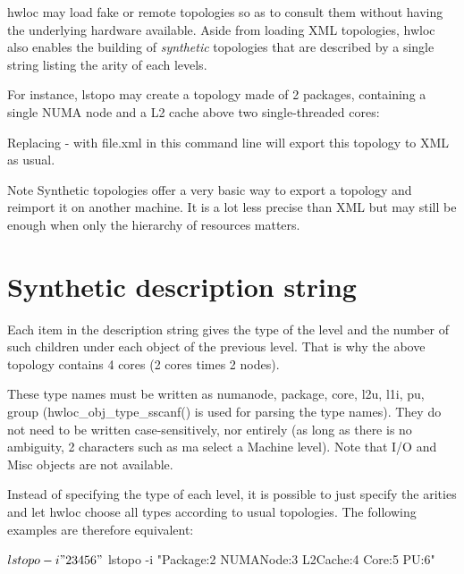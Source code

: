 

hwloc may load fake or remote topologies so as to consult them without having the underlying hardware available. Aside from loading X\+ML topologies, hwloc also enables the building of {\itshape synthetic} topologies that are described by a single string listing the arity of each levels.

For instance, lstopo may create a topology made of 2 packages, containing a single N\+U\+MA node and a L2 cache above two single-\/threaded cores\+:



Replacing {\ttfamily -\/} with {\ttfamily file.\+xml} in this command line will export this topology to X\+ML as usual.

\begin{DoxyNote}{Note}
Synthetic topologies offer a very basic way to export a topology and reimport it on another machine. It is a lot less precise than X\+ML but may still be enough when only the hierarchy of resources matters.
\end{DoxyNote}
 \hypertarget{a00389_synthetic_string}{}\section{Synthetic description string}\label{a00389_synthetic_string}
Each item in the description string gives the type of the level and the number of such children under each object of the previous level. That is why the above topology contains 4 cores (2 cores times 2 nodes).

These type names must be written as {\ttfamily numanode}, {\ttfamily package}, {\ttfamily core}, {\ttfamily l2u}, {\ttfamily l1i}, {\ttfamily pu}, {\ttfamily group} (hwloc\+\_\+obj\+\_\+type\+\_\+sscanf() is used for parsing the type names). They do not need to be written case-\/sensitively, nor entirely (as long as there is no ambiguity, 2 characters such as {\ttfamily ma} select a Machine level). Note that I/O and Misc objects are not available.

Instead of specifying the type of each level, it is possible to just specify the arities and let hwloc choose all types according to usual topologies. The following examples are therefore equivalent\+: \begin{DoxyVerb}$ lstopo -i "2 3 4 5 6"
$ lstopo -i "Package:2 NUMANode:3 L2Cache:4 Core:5 PU:6"
\end{DoxyVerb}



